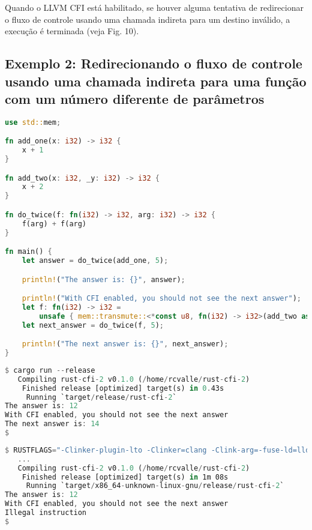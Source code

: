 \documentclass{article}
\begin{document}
Quando o LLVM CFI está habilitado, se houver alguma tentativa de redirecionar o fluxo de controle usando uma chamada indireta para um destino inválido, a execução é terminada (veja Fig. 10).


\subsection{Exemplo 2: Redirecionando o fluxo de controle usando uma chamada indireta para uma função com um número diferente de parâmetros}

\begin{lstlisting}[language=Rust, caption={Redirecionando o fluxo de controle usando uma chamada indireta para uma função com um número de parâmetros diferente dos argumentos passados no local de chamada.}]
use std::mem;

fn add_one(x: i32) -> i32 {
    x + 1
}

fn add_two(x: i32, _y: i32) -> i32 {
    x + 2
}

fn do_twice(f: fn(i32) -> i32, arg: i32) -> i32 {
    f(arg) + f(arg)
}

fn main() {
    let answer = do_twice(add_one, 5);

    println!("The answer is: {}", answer);

    println!("With CFI enabled, you should not see the next answer");
    let f: fn(i32) -> i32 =
        unsafe { mem::transmute::<*const u8, fn(i32) -> i32>(add_two as *const u8) };
    let next_answer = do_twice(f, 5);

    println!("The next answer is: {}", next_answer);
}
\end{lstlisting}

\begin{lstlisting}[language=Rust, caption={Compilação e execução da Fig. 11 com LLVM CFI desabilitado.}]
$ cargo run --release
   Compiling rust-cfi-2 v0.1.0 (/home/rcvalle/rust-cfi-2)
    Finished release [optimized] target(s) in 0.43s
     Running `target/release/rust-cfi-2`
The answer is: 12
With CFI enabled, you should not see the next answer
The next answer is: 14
$
\end{lstlisting}

\begin{lstlisting}[language=Rust, caption={Compilação e execução da Fig. 11 com LLVM CFI habilitado.}]
$ RUSTFLAGS="-Clinker-plugin-lto -Clinker=clang -Clink-arg=-fuse-ld=lld -Zsanitizer=cfi" cargo run -Zbuild-std -Zbuild-std-features --release --target x86_64-unknown-linux-gnu
   ...
   Compiling rust-cfi-2 v0.1.0 (/home/rcvalle/rust-cfi-2)
    Finished release [optimized] target(s) in 1m 08s
     Running `target/x86_64-unknown-linux-gnu/release/rust-cfi-2`
The answer is: 12
With CFI enabled, you should not see the next answer
Illegal instruction
$
\end{lstlisting}
\end{document}
